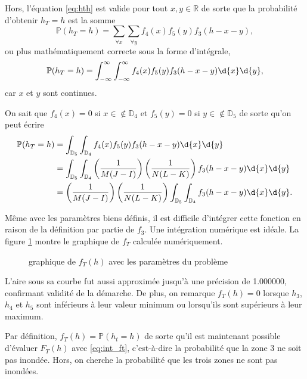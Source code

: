 \documentclass[11pt]{article}
\begin{document}
Hors, l'équation \eqref{eq:hth} est valide pour tout $x,y\in\mathbb{R}$ de
sorte que la probabilité d'obtenir $h_T=h$ est la somme
\begin{equation*}
    \mathbb{P}(h_T=h)=\sum_{\forall x}\sum_{\forall y}f_4(x)f_5(y)f_3(h-x-y),
\end{equation*}
ou plus mathématiquement correcte sous la forme d'intégrale,
\begin{equation*}
    \mathbb{P}(h_T=h)=
    \int_{-\infty}^\infty\int_{-\infty}^\infty
        f_4(x)f_5(y)f_3(h-x-y)\d{x}\d{y},
\end{equation*}
car $x$ et $y$ sont continues.

On sait que $f_4(x)=0$ si $x\in\notin\mathbb{D}_4$ et $f_5(y)=0$ si
$y\in\notin\mathbb{D}_5$ de sorte qu'on peut écrire
\begin{equation*}
    \begin{split}
        \mathbb{P}(h_T=h)&=
        \int_{\mathbb{D}_5}\int_{\mathbb{D}_4}
            f_4(x)f_5(y)f_3(h-x-y)\d{x}\d{y}\\&=
        \int_{\mathbb{D}_5}\int_{\mathbb{D}_4}
            \left(\frac{1}{M(J-I)}\right)
            \left(\frac{1}{N(L-K)}\right)
            f_3(h-x-y)\d{x}\d{y}\\&=
        \left(\frac{1}{M(J-I)}\right)
        \left(\frac{1}{N(L-K)}\right)
        \int_{\mathbb{D}_5}\int_{\mathbb{D}_4}
            f_3(h-x-y)\d{x}\d{y}.
    \end{split}
\end{equation*}

Même avec les paramètres biens définis, il est difficile d'intégrer cette
fonction en raison de la définition par partie de $f_3$. Une intégration
numérique est idéale. La figure \ref{fig:graphique_ft} montre le graphique
de $f_T$ calculée numériquement.

\begin{figure}[H]
    \def\prefixf{}
    \centering
    
    \caption{graphique de $f_T(h)$ avec les paramètres du problème}
    \label{fig:graphique_ft}
\end{figure}

L'aire sous sa courbe fut aussi approximée jusqu'à une précision de
\SI{1.000000}{}, confirmant validité de la démarche. De plus, on remarque
$f_T(h)=0$ lorsque $h_3$, $h_4$ et $h_5$ sont inférieurs à leur valeur
minimum ou lorsqu'ils sont supérieurs à leur maximum.

Par définition, $f_T(h)=\mathbb{P}(h_t=h)$ de sorte qu'il est maintenant
possible d'évaluer $F_T(h)$ avec \eqref{eq:int_ft}, c'est-à-dire la
probabilité que la zone 3 ne soit pas inondée. Hors, on cherche la
probabilité que les trois zones ne sont pas inondées.
\end{document}
